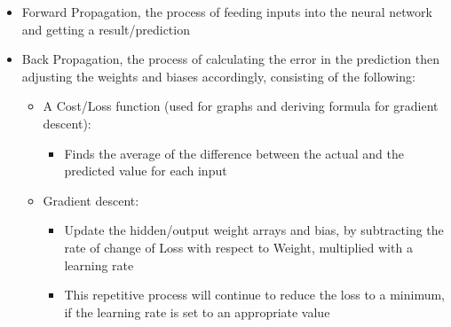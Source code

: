 \documentclass[10pt,a4paper]{article}
\begin{document}
\begin{itemize}
    \item Forward Propagation, the process of feeding inputs into the neural network and getting a result/prediction
    \item Back Propagation, the process of calculating the error in the prediction then adjusting the weights and biases accordingly, consisting of the following:
    \begin {itemize}
        \item A Cost/Loss function (used for graphs and deriving formula for gradient descent):
        \begin{itemize}
            \item Finds the average of the difference between the actual and the predicted value for each input
        \end{itemize}
        \item Gradient descent:
        \begin{itemize}
            \item Update the hidden/output weight arrays and bias, by subtracting the rate of change of Loss with respect to Weight, multiplied with a learning rate
            \item This repetitive process will continue to reduce the loss to a minimum, if the learning rate is set to an appropriate value
        \end{itemize}
    \end{itemize}
\end{itemize}
\end{document}
